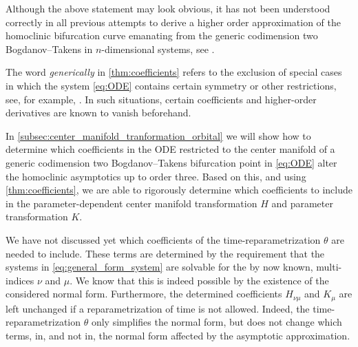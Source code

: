 Although the above statement may look obvious, it has not been understood correctly
in all previous attempts to derive a higher order approximation of the homoclinic
bifurcation curve emanating from the generic codimension two Bogdanov--Takens in
$n$-dimensional systems, see \cite{Al-Hdaibat2016,Kuznetsov2014improved,Gray-Scott2015}.

The word \emph{generically} in \cref{thm:coefficients} refers to the exclusion
of special cases in which the system \cref{eq:ODE} contains certain symmetry or
other restrictions, see, for example, \cite[2.3.3 Symetries and
Reversibility]{Iooss@2011}. In such situations, certain coefficients and
higher-order derivatives are known to vanish beforehand.

In \cref{subsec:center_manifold_tranformation_orbital} we will show how to
determine which coefficients in the ODE restricted to the center manifold of a
generic codimension two Bogdanov--Takens bifurcation point in \cref{eq:ODE}
alter the homoclinic asymptotics up to order three. Based on this, and
using \cref{thm:coefficients}, we are able to rigorously determine which
coefficients to include in the parameter-dependent center manifold
transformation $H$ and parameter transformation $K$.


\begin{remark}
We have not discussed yet which coefficients of the time-reparametrization $\theta$ are
needed to include. These terms are determined by the requirement that the systems in
\cref{eq:general_form_system} are solvable for the by now known, multi-indices
$\nu$ and $\mu$. We know that this is indeed possible by the existence of the
considered normal form. Furthermore, the determined coefficients $H_{\nu\mu}$ and
$K_{\mu}$ are left unchanged if a reparametrization of time is not allowed.
Indeed, the time-reparametrization $\theta$ only simplifies the normal form,
but does not change which terms, in, and not in, the normal form affected
by the asymptotic approximation.
\end{remark}



